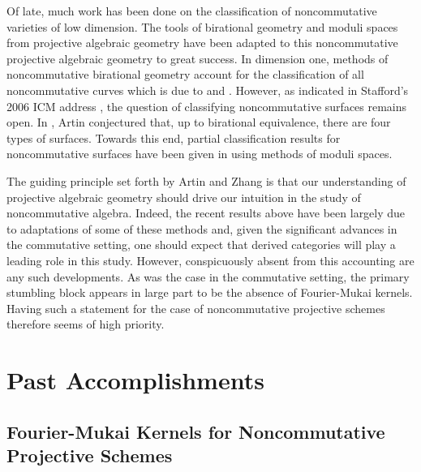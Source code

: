 \documentclass[11pt]{article}
\begin{document}
Of late, much work has been done on the classification of noncommutative varieties of low dimension.
The tools of birational geometry and moduli spaces from projective algebraic geometry have been adapted to this noncommutative projective algebraic geometry to great success.
In dimension one, methods of noncommutative birational geometry account for the classification of all noncommutative curves which is due to \cite{AS95} and \cite{Reiten-VdB}.
However, as indicated in Stafford's 2006 ICM address \cite{Stafford02}, the question of classifying noncommutative surfaces remains open.
In \cite{ArtinConj}, Artin conjectured that, up to birational equivalence, there are four types of surfaces.
Towards this end, partial classification results for noncommutative surfaces have been given in \cite{ATV,Stephenson96,Stephenson97} using methods of moduli spaces.

The guiding principle set forth by Artin and Zhang is that our understanding of projective algebraic geometry should drive our intuition in the study of noncommutative algebra.
Indeed, the recent results above have been largely due to adaptations of some of these methods and, given the significant advances in the commutative setting, one should expect that derived categories will play a leading role in this study.
However, conspicuously absent from this accounting are any such developments.
As was the case in the commutative setting, the primary stumbling block appears in large part to be the absence of Fourier-Mukai kernels.
Having such a statement for the case of noncommutative projective schemes therefore seems of high priority.
\section{Past Accomplishments}

\subsection{Fourier-Mukai Kernels for Noncommutative Projective Schemes}
\end{document}
